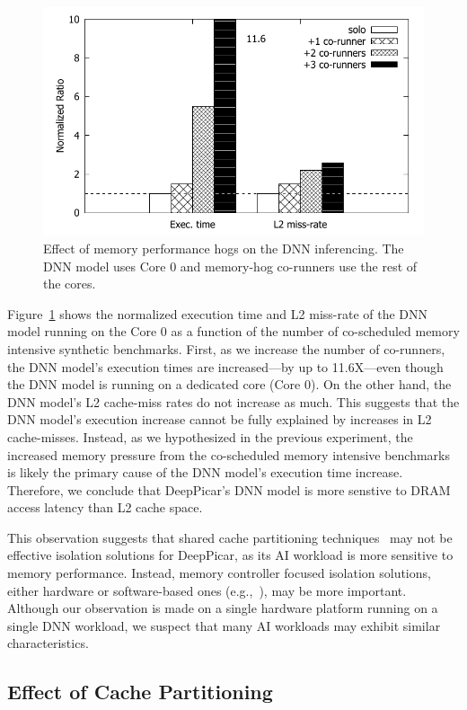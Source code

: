 \begin{figure}[h]
  \centering
  \includegraphics[width=.7\textwidth]{figs/perf_vs_bandwidth}
  \caption{Effect of memory performance hogs on the DNN
    inferencing. The DNN model uses Core 0 and memory-hog co-runners
    use the rest of the cores.}
  \label{fig:}
\end{figure}

Figure~\ref{fig:} shows the normalized execution time and L2 miss-rate
of the DNN model running on the Core 0 as a function of the number of
co-scheduled memory intensive synthetic benchmarks. First, as we
increase the number of co-runners, the DNN model's execution times are
increased---by up to 11.6X---even though the DNN model is running on a
dedicated core (Core 0). On the other hand, the DNN model's L2
cache-miss rates do not increase as much. This suggests that
the DNN model's execution increase cannot be fully explained by
increases in L2 cache-misses. Instead, as we hypothesized in the previous
experiment, the increased memory pressure from the co-scheduled memory
intensive benchmarks is likely the primary cause of the DNN model's execution
time increase. Therefore, we conclude that DeepPicar's DNN model is
more senstive to DRAM access latency than L2 cache space.

This observation suggests that shared cache partitioning
techniques~\cite{Gracioli2015,Kim2016} may not be effective isolation
solutions for DeepPicar, as its AI workload is more sensitive to memory
performance. Instead, memory controller focused isolation solutions,
either hardware or software-based ones (e.g.,~\cite{Guo2017,Yun2013}),
may be more important. Although our observation is made on a single
hardware platform running on a single DNN workload, we suspect that
many AI workloads may exhibit similar characteristics.

\subsection{Effect of Cache Partitioning}

